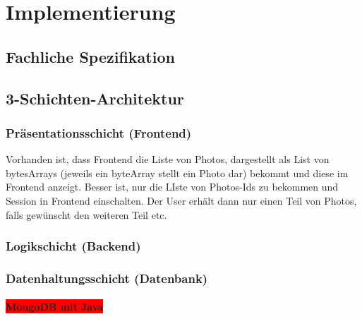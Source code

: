 \chapter{Implementierung}\label{implement}

\section{Fachliche Spezifikation}

\section{3-Schichten-Architektur}

\subsection{Präsentationsschicht (Frontend)}

Vorhanden ist, dass Frontend die Liste von Photos, dargestellt als List von bytesArrays (jeweils ein byteArray stellt ein Photo dar) bekommt und diese im Frontend anzeigt. Besser ist, nur die LIste von Photos-Ids zu bekommen und  Session in Frontend einschalten. Der User erhält dann nur einen Teil von Photos, falls gewünscht den weiteren Teil etc.

\subsection{Logikschicht (Backend)}

\subsection{Datenhaltungsschicht (Datenbank)}
\subsubsection{\colorbox{red}{MongoDB mit Java}}

